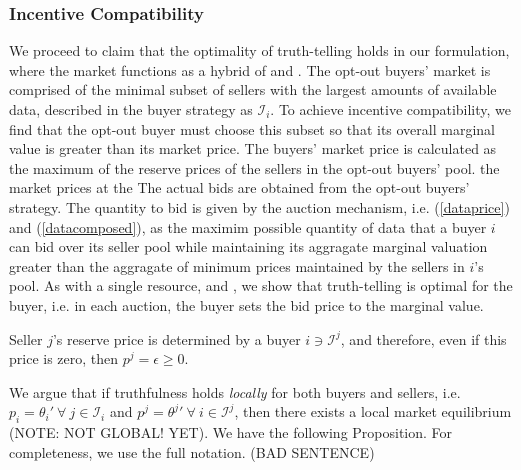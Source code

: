 \documentclass[12pt]{article}
\theoremstyle{definition}
\newcommand{\mcI}{\mathcal{I}}
\begin{document}
\begin{multicols}{2}
\subsubsection{Incentive Compatibility}

We proceed to claim that the optimality of truth-telling holds in our
formulation, where the market functions as a hybrid of \cite{semret} and
\cite{zheng}. The opt-out buyers' market is comprised of the minimal subset of
sellers with the largest amounts of available data, described in the buyer strategy as $\mcI_i$.
To achieve incentive compatibility, we find that the opt-out buyer must choose this subset so that
its overall marginal value is greater than its market price.
The buyers' market price is calculated as the maximum of the reserve prices
of the sellers in the opt-out buyers' pool.
the market prices at the %
The actual bids are
obtained from the opt-out buyers' strategy. The quantity to bid is given
by the auction mechanism, i.e. (\ref{dataprice}) and (\ref{datacomposed}), as
the maximim possible quantity of data that a buyer $i$ can bid over its seller
pool while maintaining its aggragate marginal valuation greater than the aggragate of
minimum prices maintained by the sellers in $i$'s pool.
As with a single resource, \cite{semret} and
\cite{lazar}, we show that truth-telling is optimal for the buyer, i.e. in each auction, the buyer sets
the bid price to the marginal value.

Seller $j$'s reserve price is determined by a
buyer $i \ni \mcI^j$, and therefore, even if this price is zero,
then $p^j = \epsilon \ge 0$.

We argue that if truthfulness holds \emph{locally} for both buyers and sellers, i.e. $p_i ={\theta_i}' \
\forall \ j \in \mcI_i$ and $p^j = {\theta^j}' \ \forall \ i \in\mcI^j$, then
there exists a local market
equilibrium (NOTE: NOT GLOBAL! YET). We have the following Proposition. For
completeness, we use the full notation. (BAD SENTENCE)


\end{multicols}
\end{document}
